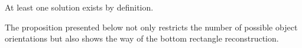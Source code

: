 \documentclass[graybox]{svmult}
\begin{document}

\begin{remark}
At least one solution exists by definition.
\end{remark}

\begin{remark}
The proposition presented below not only restricts the number of possible object orientations but also shows the way of the bottom rectangle reconstruction.
\end{remark}
\end{document}
